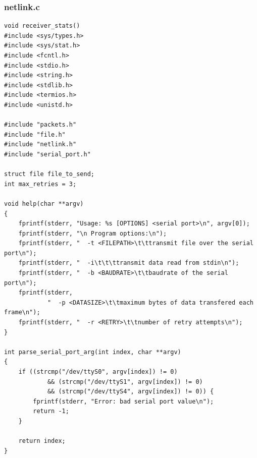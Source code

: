 \documentclass[a4paper,11pt,titlepage]{article}
\begin{document}
\subsubsection*{netlink.c}
\begin{lstlisting}[style=customcwithlines]
void receiver_stats()
#include <sys/types.h>
#include <sys/stat.h>
#include <fcntl.h>
#include <stdio.h>
#include <string.h>
#include <stdlib.h>
#include <termios.h>
#include <unistd.h>

#include "packets.h"
#include "file.h"
#include "netlink.h"
#include "serial_port.h"

struct file file_to_send;
int max_retries = 3;

void help(char **argv)
{
	fprintf(stderr, "Usage: %s [OPTIONS] <serial port>\n", argv[0]);
	fprintf(stderr, "\n Program options:\n");
	fprintf(stderr, "  -t <FILEPATH>\t\ttransmit file over the serial port\n");
	fprintf(stderr, "  -i\t\t\ttransmit data read from stdin\n");
	fprintf(stderr, "  -b <BAUDRATE>\t\tbaudrate of the serial port\n");
	fprintf(stderr,
			"  -p <DATASIZE>\t\tmaximum bytes of data transfered each frame\n");
	fprintf(stderr, "  -r <RETRY>\t\tnumber of retry attempts\n");
}

int parse_serial_port_arg(int index, char **argv)
{
	if ((strcmp("/dev/ttyS0", argv[index]) != 0)
			&& (strcmp("/dev/ttyS1", argv[index]) != 0)
			&& (strcmp("/dev/ttyS4", argv[index]) != 0)) {
		fprintf(stderr, "Error: bad serial port value\n");
		return -1;
	}

	return index;
}


\end{lstlisting}
\end{document}
